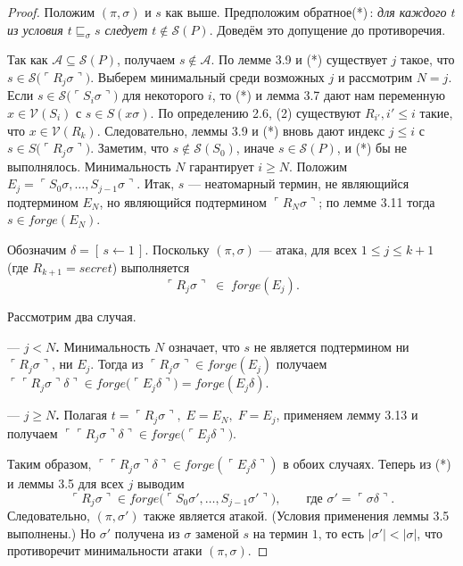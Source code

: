 \begin{proof}
Положим $(\pi,\sigma)$ и $s$ как выше.
Предположим обратное\;(*)\,: \emph{для каждого $t$ из условия
$t\sqsubseteq_{\sigma}s$ следует $t\notin \mathcal S(P)$}.
Доведём это допущение до противоречия.

Так как $\mathcal A\subseteq \mathcal S(P)$, получаем $s\notin \mathcal A$.
По лемме 3.9 и (*)
существует $j$ такое, что
\(s\in \mathcal S\!\bigl(\ulcorner R_j\sigma\urcorner\bigr)\).
Выберем минимальный среди возможных $j$ и
рассмотрим $N=j$.
Если
\(s\in \mathcal S\!\bigl(\ulcorner S_i\sigma\urcorner\bigr)\)
для некоторого $i$, то (*)
и лемма 3.7 дают нам переменную
\(x\in\mathcal V(S_i)\) с
\(s\in S(x\sigma)\).
По определению 2.6, (2)
существуют $R_{i'},i'\le i$ такие, что
\(x\in\mathcal V(R_{k})\).
Следовательно, леммы 3.9 и (*) вновь
дают индекс $j\le i$ с
\(s\in S\!\bigl(\ulcorner R_j\sigma\urcorner\bigr)\).
Заметим, что
\(s\notin \mathcal S(S_0)\), иначе
\(s\in \mathcal S(P)\), и (*)
бы не выполнялось.
Минимальность $N$ гарантирует $i\ge N$.
Положим
\(E_j=\ulcorner S_0\sigma,\dots,S_{j-1}\sigma \urcorner\).
Итак, $s$ — неатомарный термин,
не являющийся подтермином $E_N$,
но являющийся подтермином
\(\ulcorner R_N\sigma\urcorner\);
по лемме 3.11 тогда
\(s\in forge(E_N)\).

Обозначим $\delta=[\,s\!\leftarrow\!1\,]$.
Поскольку $(\pi,\sigma)$ — атака,
для всех $1\le j\le k+1$
(где $R_{k+1}=\textit{secret}$) выполняется
\[
  \ulcorner R_j\sigma\urcorner \;\in\;
   forge(E_j).
\]

Рассмотрим два случая.

\medskip
\noindent— \textbf{$j<N$.}
Минимальность $N$ означает, что $s$ не является подтермином
ни \(\ulcorner R_j\sigma\urcorner\), ни $E_j$.
Тогда из
\(\ulcorner R_j\sigma\urcorner\in forge(E_j)\)
получаем
\(
  \ulcorner\ulcorner R_j\sigma\urcorner\delta\urcorner
  \in
  forge\!\bigl(\ulcorner E_j\delta\urcorner\bigr)
  =forge(E_j\delta).
\)

\medskip
\noindent— \textbf{$j\ge N$.}
Полагая
\(t=\ulcorner R_j\sigma\urcorner,\;E=E_N,\;F=E_j\),
применяем лемму 3.13 и
получаем
\(
  \ulcorner\ulcorner R_j\sigma\urcorner\delta\urcorner
  \in
   forge\!\bigl(\ulcorner E_j\delta\urcorner\bigr).
\)

\noindent
Таким образом,
\(\ulcorner\ulcorner R_j\sigma\urcorner\delta\urcorner\in
  forge(\ulcorner E_j\delta\urcorner)\)
в обоих случаях.
Теперь из (*) и леммы 3.5
для всех $j$ выводим
\[
  \ulcorner R_j\sigma\urcorner
  \in
   forge
  \bigl(
    \ulcorner S_0\sigma',\dots,S_{j-1}\sigma'\urcorner
  \bigr),
  \qquad
  \text{где }\sigma'=\ulcorner\sigma\delta\urcorner.
\]
Следовательно, $(\pi,\sigma')$ также является атакой.
(Условия применения леммы 3.5 выполнены.)
Но $\sigma'$ получена из $\sigma$ заменой $s$ на термин $1$,
то есть
\(|\sigma'|<|\sigma|\),
что противоречит минимальности атаки $(\pi,\sigma)$.
\end{proof}

